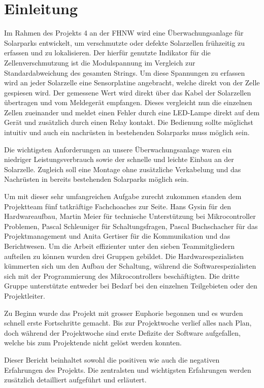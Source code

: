 \section{Einleitung}


Im Rahmen des Projekts 4 an der FHNW wird eine Überwachungsanlage für Solarparks entwickelt, um verschmutzte oder defekte Solarzellen frühzeitig zu erfassen und zu lokalisieren. Der hierfür genutzte Indikator für die Zellenverschmutzung ist die Modulspannung im Vergleich zur Standardabweichung des gesamten Strings. Um diese Spannungen zu erfassen wird an jeder Solarzelle eine Sensorplatine angebracht, welche direkt von der Zelle gespiesen wird. Der gemessene Wert wird direkt über das Kabel der Solarzellen übertragen und vom Meldegerät empfangen. Dieses vergleicht nun die einzelnen Zellen zueinander und meldet einen Fehler durch eine LED-Lampe direkt auf dem Gerät und zusätzlich durch einen Relay kontakt. Die Bedienung sollte möglichst intuitiv und auch ein nachrüsten in bestehenden Solarparks muss möglich sein.

Die wichtigsten Anforderungen an unsere Überwachungsanlage waren ein niedriger Leistungsverbrauch sowie der schnelle und leichte Einbau an der Solarzelle. Zugleich soll eine Montage ohne zusätzliche Verkabelung und das Nachrüsten in bereits bestehenden Solarparks möglich sein.
 
Um mit dieser sehr umfangreichen Aufgabe zurecht zukommen standen dem Projektteam fünf tatkräftige Fachchoaches zur Seite. Hans Gysin für den Hardwareaufbau, Martin Meier für technische Unterstützung bei Mikrocontroller Problemen, Pascal Schleuniger für Schaltungsfragen, Pascal Buchschacher für das Projektmanagement und Anita Gertiser für die Kommunikation und das Berichtwesen. Um die Arbeit effizienter unter den sieben Teammitgliedern aufteilen zu können wurden drei Gruppen gebildet. Die Hardwarespezialisten kümmerten sich um den Aufbau der Schaltung, während die Softwarespezialisten sich mit der Programmierung des Mikrocontrollers beschäftigten. Die dritte Gruppe unterstützte entweder bei Bedarf bei den einzelnen Teilgebieten oder den Projektleiter.

Zu Beginn wurde das Projekt mit grosser Euphorie begonnen und es wurden schnell erste Fortschritte gemacht. Bis zur Projektwoche verlief alles nach Plan, doch während der Projektwoche sind erste Defizite der Software aufgefallen, welche bis zum Projektende nicht gelöst werden konnten. 

Dieser Bericht beinhaltet sowohl die positiven wie auch die negativen Erfahrungen des Projekts. Die zentralsten und wichtigsten Erfahrungen werden zusätzlich detailliert aufgeführt und erläutert.
